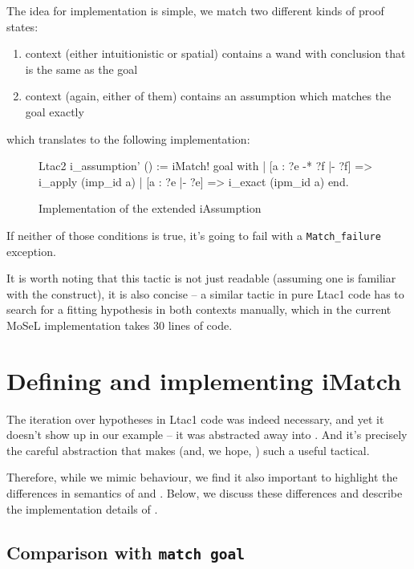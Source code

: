 The idea for implementation is simple, we match two different kinds of proof states:
\begin{enumerate}
\item context (either intuitionistic or spatial) contains a wand with conclusion that is the same as the goal
\item context (again, either of them) contains an assumption which matches the goal exactly
\end{enumerate}

which translates to the following implementation:

\begin{figure}[H]
\begin{coq}
Ltac2 i_assumption' () :=
  iMatch! goal with
  | [a : ?e -* ?f |- ?f] => i_apply (imp_id a)
  | [a : ?e |- ?e] => i_exact (ipm_id a)
  end.
\end{coq}
  \caption{Implementation of the extended iAssumption}
  \label{fig:iassumption-prime}
\end{figure}

If neither of those conditions is true, it's going to fail with a {\color{red} \texttt{Match\_failure}} exception.

It is worth noting that this tactic is not just readable (assuming one is familiar with the  construct), it is also concise -- a similar tactic in pure Ltac1 code has to search for a fitting hypothesis in both contexts manually, which in the current MoSeL implementation takes 30 lines of code.

\section{Defining and implementing iMatch}
\label{sec:defin-impl-imatch}

The iteration over hypotheses in Ltac1 code was indeed necessary, and yet it doesn't show up in our example -- it was abstracted away into .
And it's precisely the careful abstraction that makes  (and, we hope, ) such a useful tactical.

Therefore, while we mimic  behaviour, we find it also important to highlight the differences in semantics of  and .
Below, we discuss these differences and describe the implementation details of .

\subsection{Comparison with \texttt{match goal}}

